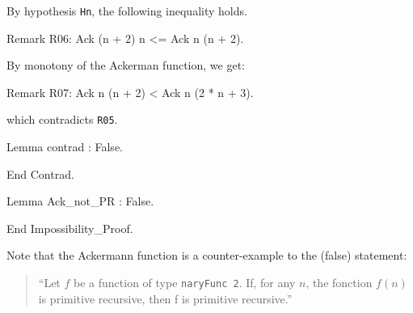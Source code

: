  By hypothesis \texttt{Hn}, the following inequality holds.

 \begin{Coqsrc}
    Remark R06: Ack (n + 2) n <= Ack n (n + 2).
 \end{Coqsrc}

By monotony of the Ackerman function, we get:

\begin{Coqsrc}
    Remark R07: Ack n (n + 2) < Ack n (2 * n + 3).
\end{Coqsrc}
     
which contradicts \texttt{R05}.

\begin{Coqsrc}
    Lemma contrad : False.
   
  End Contrad.

  Lemma Ack_not_PR : False.

End Impossibility_Proof.
\end{Coqsrc}









      


\begin{remark}
Note that the Ackermann function is a counter-example to the (false) statement:
\begin{quote}
{\color{red}
  ``Let $f$ be a function of type \texttt{naryFunc\,2}. If, for any $n$, the fonction $f(n)$ is primitive recursive, then f is primitive recursive.''}
\end{quote}
\end{remark}




